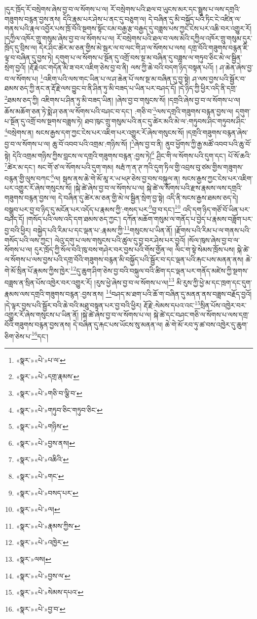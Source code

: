 །དུར་ཁྲོད་རོ་བསྲེགས་ཞེས་བྱ་བ་ལ་སོགས་པ་ལ། རོ་བསྲེགས་པའི་ཐལ་བ་ཡུངས་མར་དང་སྦྲུས་པ་ལས་དགྲའི་གཟུགས་བརྙན་བྱས་ནས། དེའི་རྣམ་པར་ཤེས་པ་ནང་དུ་བཅུག་ལ། དེ་བཞིན་དུ་མི་བསྐྱོད་པའི་ཏིང་ངེ་འཛིན་ལ་གནས་པའི་རྣལ་འབྱོར་པས་ཁྲོ་བོའི་སྔགས་སྟོང་ངམ་བརྒྱ་རྩ་བརྒྱད་དུ་བཟླས་པས་ཀྱང་ངེས་པར་འཆི་བར་འགྱུར་རོ། །དཀྱིལ་འཁོར་གྲུ་གསུམ་ཞེས་བྱ་བ་ལ་སོགས་པ་ལ། རོ་བསྲེགས་པའི་ཐལ་བ་ལས་མེའི་དཀྱིལ་འཁོར་གྲུ་གསུམ་དུར་ཁྲོད་དུ་བྲིས་ལ། དེར་ཤིང་ཚེར་མ་ཅན་གྱིས་མེ་སྦར་ལ་བ་ལང་གི་ཤ་ལ་སོགས་པ་ལས། དགྲ་བོའི་གཟུགས་བརྙན་ཇི་ལྟ་བ་བཞིན་དུ་བྱས་ཏེ། དགུག་པ་ལ་སོགས་པ་སྔོན་དུ་འགྲོ་བས་སྔ་མ་བཞིན་དུ་བཟླས་ལ་གཏུབ་ཅིང་མེ་ལ་སྦྱིན་སྲེག་བྱའོ། །རྡོ་རྗེའང་གདོན་མི་ཟ་བར་འཇིག་ཅེས་བྱ་བ་ནི། ལས་ཀྱི་ཆེ་བའི་བདག་ཉིད་བསྟན་པའོ། །
ཤ་ཆེན་ཞེས་བྱ་བ་ལ་སོགས་པ། \footnote{«སྣར་»«པེ་»པ་ལ་}འཇིག་པའི་ལས་གང་ཡིན་པ་ལ་ཤ་ཆེན་པོ་ལས་སྔ་མ་བཞིན་དུ་བྱ་སྟེ། ཤ་ལས་བྱས་པའི་སྦྱོར་བ་ཐམས་ཅད་ཀྱི་ནང་ན་རྡོ་རྗེ་ལས་བྱུང་བ་ནི་ཤིན་ཏུ་མི་བཟད་པ་ཡིན་པར་བཤད་དོ། །དེ་ཉིད་ཀྱི་ཕྱིར་འདི་ནི་དགྲ་\footnote{«སྣར་»«པེ་»དགྲ་རྣམས་}ཐམས་ཅད་ཀྱི། འཇིགས་པ་ཤིན་ཏུ་མི་བཟད་ཡིན། །ཞེས་བྱ་བ་གསུངས་སོ། །དགྲའི་ཞེས་བྱ་བ་ལ་སོགས་པ་ལ། ཆོས་མཆོག་ཅན་ཏེ་སྨེ་ཤ་ཅན་ལ་སོགས་པའི་བཤང་བ་དང་། :གཅི་བ་\footnote{«སྣར་»«པེ་»གཅི་བ་ལྕི་བ་}ལས་དགྲའི་གཟུགས་བརྙན་བྱས་ལ། དགུག་པ་སྔོན་དུ་འགྲོ་བས་སྔགས་བཟླས་ཏེ། ཐབ་ཁུང་གྲུ་གསུམ་པའི་ནང་དུ་ཚེར་མའི་མེ་ལ་:གཏུབས་ཤིང་གཏུབས་ཤིང་\footnote{«སྣར་»«པེ་»གཏུབ་ཅིང་གཏུབ་ཅིང་}བསྲེགས་ན། སངས་རྒྱས་དག་ཀྱང་ངེས་པར་འཇིག་པར་འགྱུར་རོ་ཞེས་གསུངས་སོ། །དགྲའི་གཟུགས་བརྙན་ཞེས་བྱ་བ་ལ་སོགས་པ་ལ། ཆུ་བོ་འབབ་པའི་འགྲམ་:གཉིས་སོ། །\footnote{«སྣར་»«པེ་»གཉིས་}ཞེས་བྱ་བ་ནི། ནུབ་ཕྱོགས་ཀྱི་རྒྱ་མཚོ་འབབ་པའི་ཆུ་བོ་སྟེ། དེའི་འགྲམ་གཉིས་ཀྱིས་བླངས་ལ་དགྲའི་གཟུགས་བརྙན་:བྱས་ཏེ།\footnote{«སྣར་»«པེ་»བྱས་ནས།} ཤྲིང་གི་ལ་སོགས་པའི་དུག་དང་། པོ་སོ་ཆའི་\footnote{«སྣར་»«པེ་»འཆིའི་}ཚེར་མ་དང་། སང་གོ་ཙ་ལ་སོགས་པའི་དུག་གམ། སརྦཾ་ཀ་ན་ཊ་ཀའི་དུག་ཏིལ་གྱི་འབྲས་བུ་ཙམ་གྱིས་གཟུགས་བརྙན་གྱི་ལུས་བཀང་\footnote{«སྣར་»«པེ་»གང་}ལ། སྦས་ནས་ཆེ་གེ་མོ་མཱ་ར་ཡ་ཕཊ་ཅེས་བྱ་བས་བསྐུལ་ན། སངས་རྒྱས་ཀྱང་ངེས་པར་འཇིག་པར་འགྱུར་རོ་ཞེས་གསུངས་སོ། །སྐེ་ཚེ་ཞེས་བྱ་བ་ལ་སོགས་པ་ལ། སྐེ་ཚེ་ལ་སོགས་པའི་རྫས་རྣམས་ལས་དགྲའི་གཟུགས་བརྙན་བྱས་ལ། དེ་བཞིན་དུ་ཚེར་མ་ཅན་གྱི་མེ་ལ་སྦྱིན་སྲེག་བྱ་སྟེ། འདི་ནི་སངས་རྒྱས་ཐམས་ཅད་དེ། བསྒྲུབ་པར་བྱ་བ་ཉིད་དུ་མངོན་པར་འདོད་པ་རྣམས་ཀྱི་:གསད་པར་\footnote{«སྣར་»«པེ་»བསད་པར་}བྱ་བ་དང་།\footnote{«སྣར་»«པེ་»ལ།} འདི་དག་ཉིད་གཙོ་བོ་ཡིན་པར་བཤད་དོ། །གསོད་པའི་ལས་འདི་དག་ཐམས་ཅད་ཀྱང་། དཀོན་མཆོག་གསུམ་ལ་གནོད་པ་བྱེད་པ་རྣམས་བཟློག་པར་བྱ་བའི་ཕྱིར། བསྐྱེད་པའི་རིམ་པ་དང་ལྡན་པ་:རྣམས་ཀྱི་\footnote{«སྣར་»«པེ་»རྣམས་ཀྱིས་}གསུངས་པ་ཡིན་ནོ། །རྫོགས་པའི་རིམ་པ་ལ་གནས་པའི་གསོད་པའི་ལས་ཀྱང་། ལེའུ་དགུ་པ་ལས་གསུངས་པའི་ཚུལ་དུ་བྱ་བར་ཤེས་པར་བྱའོ། །སོལ་ཁུས་ཞེས་བྱ་བ་ལ་སོགས་པ་ལ། དུར་ཁྲོད་ཀྱི་སོལ་བའི་ཁུ་བས་གཤེར་བར་བྱས་པའི་གོས་གྱོན་ལ། ལིང་ག་སྟེ་སེམས་ཁྲོས་པས། སྐེ་ཚེ་ལ་སོགས་པ་ལས་བྱས་པའི་དགྲ་བོའི་གཟུགས་བརྙན་མི་བསྐྱོད་པའི་སྦྱོར་བ་དང་ལྡན་པའི་རྐང་པས་མནན་ནས། ཆེ་གེ་མོ་སྲིན་པོ་རྣམས་ཀྱིས་ཁྱེར་\footnote{«སྣར་»«པེ་»འཁྱེར་}དུ་ཆུག་ཤིག་ཅེས་བྱ་བའི་བསྐུལ་བའི་ཚིག་དང་ལྡན་པར་གནོད་མཛེས་ཀྱི་སྔགས་བཟླས་ན་སྲིན་པོས་འཁྱེར་བར་འགྱུར་རོ། །རུས་ཕྱེ་ཞེས་བྱ་བ་ལ་སོགས་པ་ལ།\footnote{«སྣར་»ལས།} མི་རུས་ཀྱི་ཕྱེ་མ་དང་ཁྲག་དང་དུག་རྣམས་ལས་དགྲའི་གཟུགས་བརྙན་:བྱས་ནས། \footnote{«སྣར་»«པེ་»བྱས་ལ་}བཤད་མ་ཐག་པའི་ཆོ་ག་བཞིན་དུ་མནན་ནས་བཟླས་བརྗོད་བྱའོ། །དེ་ལྟར་བྱས་པའི་སྦྱོར་བའི་ཆེ་བའི་མཐུ་བསྟན་པར་བྱ་བའི་ཕྱིར། རྡོ་རྗེ་:སེམས་དཔའ་འང་\footnote{«སྣར་»«པེ་»སེམས་དཔའ་}སྲིན་པོས་འཁྱེར་བར་འགྱུར་རོ་ཞེས་གསུངས་པ་ཡིན་ནོ། །སྐེ་ཚེ་ཞེས་བྱ་བ་ལ་སོགས་པ་ལ། སྐེ་ཚེ་དང་བཤང་གཅི་ལ་སོགས་པ་ལས་དགྲ་བོའི་གཟུགས་བརྙན་བྱས་ནས། དེ་བཞིན་དུ་རྐང་པས་ཡོངས་སུ་མནན་ལ། ཆེ་གེ་མོ་རབ་ཏུ་ཚ་བས་འཁྱེར་དུ་ཆུག་ཅིག་ཅེས་པ་\footnote{«སྣར་»«པེ་»བྱ་བ་}དང་། 